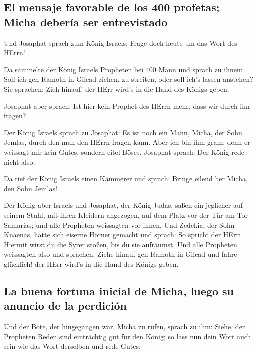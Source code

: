 \hypertarget{el-mensaje-favorable-de-los-400-profetas-micha-deberuxeda-ser-entrevistado}{%
\subsection{El mensaje favorable de los 400 profetas; Micha debería ser
entrevistado}\label{el-mensaje-favorable-de-los-400-profetas-micha-deberuxeda-ser-entrevistado}}

 Und Josaphat sprach zum König Israels: Frage doch heute
um das Wort des HErrn!

 Da sammelte der König Israels Propheten bei 400 Mann und
sprach zu ihnen: Soll ich gen Ramoth in Gilead ziehen, zu streiten, oder
soll ich's lassen anstehen? Sie sprachen: Zieh hinauf! der HErr wird's
in die Hand des Königs geben.

 Josaphat aber sprach: Ist hier kein Prophet des HErrn
mehr, dass wir durch ihn fragen?

 Der König Israels sprach zu Josaphat: Es ist noch ein
Mann, Micha, der Sohn Jemlas, durch den man den HErrn fragen kann. Aber
ich bin ihm gram; denn er weissagt mir kein Gutes, sondern eitel Böses.
Josaphat sprach: Der König rede nicht also.

 Da rief der König Israels einen Kämmerer und sprach:
Bringe eilend her Micha, den Sohn Jemlas!

 Der König aber Israels und Josaphat, der König Judas,
saßen ein jeglicher auf seinem Stuhl, mit ihren Kleidern angezogen, auf
dem Platz vor der Tür am Tor Samarias; und alle Propheten weissagten vor
ihnen.  Und Zedekia, der Sohn Knaenas, hatte sich eiserne
Hörner gemacht und sprach: So spricht der HErr: Hiermit wirst du die
Syrer stoßen, bis du sie aufräumst.  Und alle Propheten
weissagten also und sprachen: Ziehe hinauf gen Ramoth in Gilead und
fahre glücklich! der HErr wird's in die Hand des Königs geben.

\hypertarget{la-buena-fortuna-inicial-de-micha-luego-su-anuncio-de-la-perdiciuxf3n}{%
\subsection{La buena fortuna inicial de Micha, luego su anuncio de la
perdición}\label{la-buena-fortuna-inicial-de-micha-luego-su-anuncio-de-la-perdiciuxf3n}}

 Und der Bote, der hingegangen war, Micha zu rufen,
sprach zu ihm: Siehe, der Propheten Reden sind einträchtig gut für den
König; so lass nun dein Wort auch sein wie das Wort derselben und rede
Gutes.

